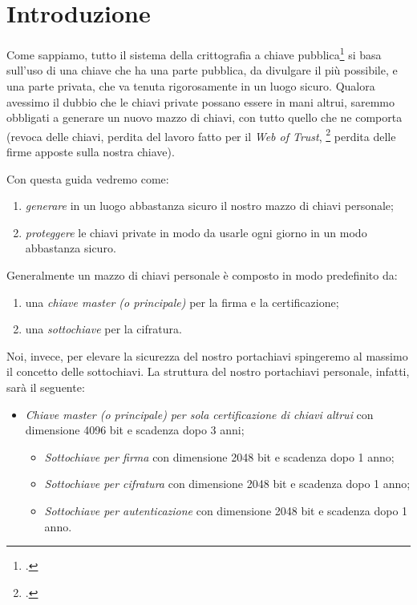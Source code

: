 \section*{Introduzione}

Come sappiamo, tutto il sistema della crittografia a chiave
pubblica\footcite[Vedi][]{wiki:crittografia} si basa sull'uso di una chiave che
ha una parte pubblica, da divulgare il più possibile, e una parte privata, che
va tenuta rigorosamente in un luogo sicuro. Qualora avessimo il dubbio che le
chiavi private possano essere in mani altrui, saremmo obbligati a generare un
nuovo mazzo di chiavi, con tutto quello che ne comporta (revoca delle chiavi,
perdita del lavoro fatto per il \emph{Web of Trust},
\footcite[Vedi][]{wiki:webtrust} perdita delle firme apposte sulla nostra
chiave).

Con questa guida vedremo come:

\begin{enumerate}
  \item \emph{generare} in un luogo abbastanza sicuro il nostro mazzo di chiavi
  personale;
  \item \emph{proteggere} le chiavi private in modo da usarle ogni giorno in un
 modo abbastanza sicuro.
\end{enumerate}

Generalmente un mazzo di chiavi personale è composto in modo
predefinito da:

\begin{enumerate}
  \item una \emph{chiave master (o principale)} per la firma e la
  certificazione;
  \item una \emph{sottochiave} per la cifratura.
\end{enumerate}

Noi, invece, per elevare la sicurezza del nostro portachiavi
spingeremo al massimo il concetto delle sottochiavi. La struttura del nostro
portachiavi personale, infatti, sarà il seguente:

\begin{itemize}
  \item \emph{Chiave master (o principale) per sola certificazione di chiavi
  altrui} con dimensione 4096 bit e scadenza dopo 3 anni;
  \begin{itemize}
    \item \emph{Sottochiave per firma} con dimensione 2048 bit e scadenza dopo 1
    anno;
    \item \emph{Sottochiave per cifratura} con dimensione 2048 bit e scadenza
    dopo 1 anno;
    \item \emph{Sottochiave per autenticazione} con dimensione 2048 bit e
    scadenza dopo 1 anno.
  \end{itemize}
\end{itemize}

